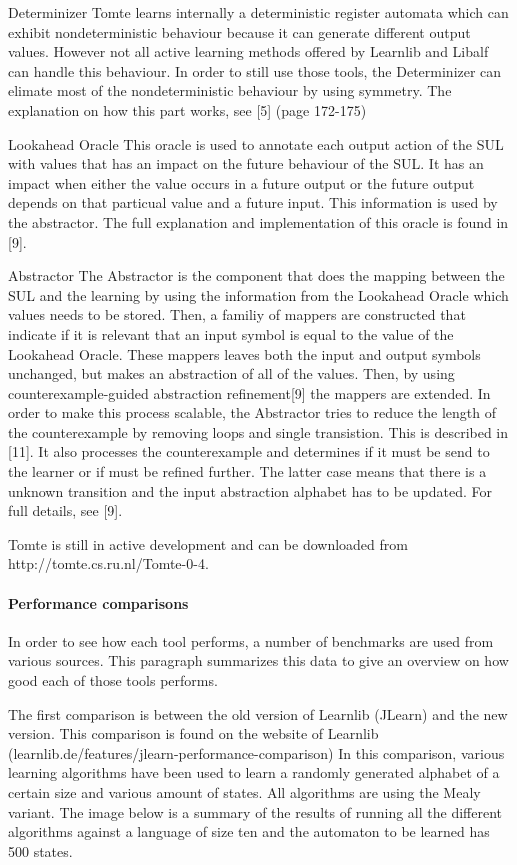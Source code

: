\documentclass[multi,crop=false,class=article]{standalone}
\begin{document}
Determinizer
Tomte learns internally a deterministic register automata %
which can exhibit nondeterministic behaviour because it can generate different output values. 
However not all active learning methods offered by Learnlib and Libalf can handle this behaviour. 
In order to still use those tools, the Determinizer can elimate most of the nondeterministic behaviour by using 
symmetry. The explanation on how this part works, see [5] (page 172-175) 

Lookahead Oracle
This oracle is used to annotate each output action of the SUL with values that has an impact on the
future behaviour of the SUL. It has an impact when either the value occurs in a future output or the future output
depends on that particual value and a future input. This information is used by the abstractor. 
The full explanation and implementation of this oracle is found in [9].

Abstractor
The Abstractor is the component that does the mapping between the SUL and the learning by using the information
from the Lookahead Oracle which values needs to be stored. Then, a familiy of mappers are constructed that
indicate if it is relevant that an input symbol is equal to the value of the Lookahead Oracle. These mappers
leaves both the input and output symbols unchanged, but makes an abstraction of all of the values. Then, by using 
counterexample-guided abstraction refinement[9] the mappers are extended.
In order to make this process scalable, the Abstractor tries to reduce the length of the counterexample by removing 
loops and single transistion. This is described in [11].
It also processes the counterexample and determines if it must be send to the learner or if must be refined further. 
The latter case means that there is a unknown transition and the input abstraction alphabet has to be updated. 
For full details, see [9].

Tomte is still in active development and can be downloaded from http://tomte.cs.ru.nl/Tomte-0-4.

\paragraph{Performance comparisons}

In order to see how each tool performs, a number of benchmarks are used from various sources.
This paragraph summarizes this data to give an overview on how good each of those tools performs.

The first comparison is between the old version of Learnlib (JLearn) and the new version.
This comparison is found on the website of Learnlib (learnlib.de/features/jlearn-performance-comparison)
In this comparison, various learning algorithms have been used to learn a randomly generated alphabet
of a certain size and various amount of states. All algorithms are using the Mealy variant. The image below is a summary of the results of running
all the different algorithms against a language of size ten and the automaton to be learned has 500 states.
\end{document}
